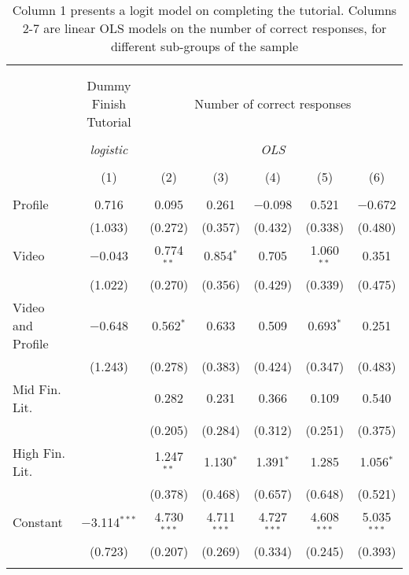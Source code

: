 
\begin{table}[H] \centering 
  \caption{Column 1 presents a logit model on completing the tutorial. Columns 2-7 are linear OLS models on the number
            of correct responses, for different sub-groups of the sample} 
  \label{tbl:Main_results_correct_response} 
\begin{tabular}{@{\extracolsep{5pt}}lcccccc} 
\\[-1.8ex]\hline 
\hline \\[-1.8ex] 
\\[-1.8ex] & Dummy Finish Tutorial & \multicolumn{5}{c}{Number of correct responses} \\ 
\\[-1.8ex] & \textit{logistic} & \multicolumn{5}{c}{\textit{OLS}} \\ 
\\[-1.8ex] & (1) & (2) & (3) & (4) & (5) & (6)\\ 
\hline \\[-1.8ex] 
 Profile & 0.716 & 0.095 & 0.261 & $-$0.098 & 0.521 & $-$0.672 \\ 
  & (1.033) & (0.272) & (0.357) & (0.432) & (0.338) & (0.480) \\ 
  Video & $-$0.043 & 0.774$^{**}$ & 0.854$^{*}$ & 0.705 & 1.060$^{**}$ & 0.351 \\ 
  & (1.022) & (0.270) & (0.356) & (0.429) & (0.339) & (0.475) \\ 
  Video and Profile & $-$0.648 & 0.562$^{*}$ & 0.633 & 0.509 & 0.693$^{*}$ & 0.251 \\ 
  & (1.243) & (0.278) & (0.383) & (0.424) & (0.347) & (0.483) \\ 
  Mid Fin. Lit. &  & 0.282 & 0.231 & 0.366 & 0.109 & 0.540 \\ 
  &  & (0.205) & (0.284) & (0.312) & (0.251) & (0.375) \\ 
  High Fin. Lit. &  & 1.247$^{**}$ & 1.130$^{*}$ & 1.391$^{*}$ & 1.285 & 1.056$^{*}$ \\ 
  &  & (0.378) & (0.468) & (0.657) & (0.648) & (0.521) \\ 
  Constant & $-$3.114$^{***}$ & 4.730$^{***}$ & 4.711$^{***}$ & 4.727$^{***}$ & 4.608$^{***}$ & 5.035$^{***}$ \\ 
  & (0.723) & (0.207) & (0.269) & (0.334) & (0.245) & (0.393) \\ 
 \hline \\[-1.8ex] 

\end{tabular}
\end{table}
